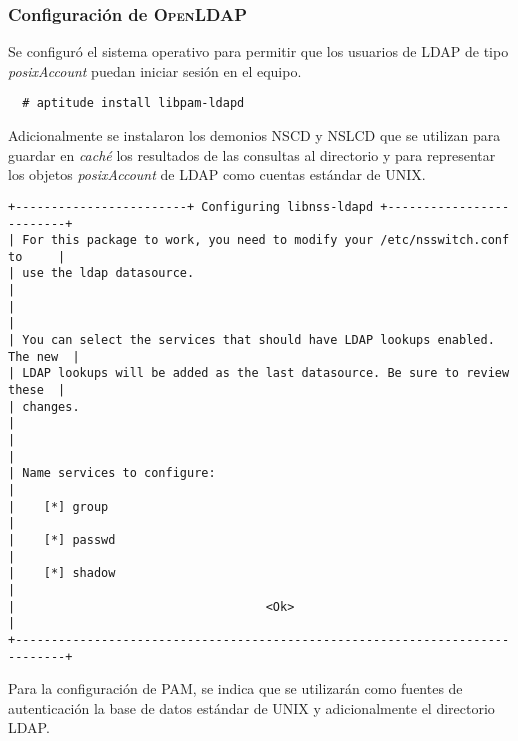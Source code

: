           \subsubsection {Configuraci\'{o}n de \textsc{OpenLDAP}}

Se configur\'{o} el sistema operativo para permitir que los usuarios de \textsc{LDAP} de tipo \textit{posixAccount} puedan iniciar sesi\'{o}n en el equipo.

{
\scriptsize
\linespread{1}
\begin{verbatim}
  # aptitude install libpam-ldapd
\end{verbatim}
}

Adicionalmente se instalaron los demonios \textsc{NSCD} y \textsc{NSLCD} que se utilizan para guardar en \textit{cach\'{e}} los resultados de las consultas al directorio y para representar los objetos \textit{posixAccount} de \textsc{LDAP} como cuentas est\'{a}ndar de \textsc{UNIX}.

{
\scriptsize
\linespread{1}
\begin{verbatim}
+------------------------+ Configuring libnss-ldapd +-------------------------+
| For this package to work, you need to modify your /etc/nsswitch.conf to     |
| use the ldap datasource.                                                    |
|                                                                             |
| You can select the services that should have LDAP lookups enabled. The new  |
| LDAP lookups will be added as the last datasource. Be sure to review these  |
| changes.                                                                    |
|                                                                             |
| Name services to configure:                                                 |
|    [*] group                                                                |
|    [*] passwd                                                               |
|    [*] shadow                                                               |
|                                   <Ok>                                      |
+-----------------------------------------------------------------------------+
\end{verbatim}
}

Para la configuraci\'{o}n de \textsc{PAM}, se indica que se utilizar\'{a}n como fuentes de autenticaci\'{o}n la base de datos est\'{a}ndar de UNIX y adicionalmente el directorio LDAP.

